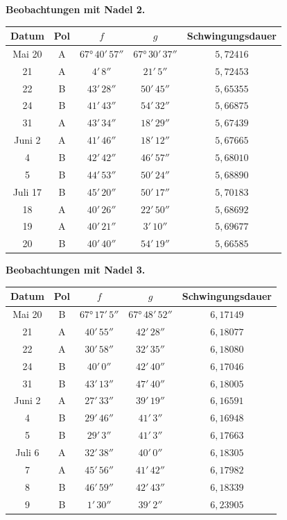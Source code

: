 \documentclass[12pt,a4paper]{article}
\begin{document}
\begin{center}
\small
\textbf{Beobachtungen mit Nadel 2.}
\begin{tabular}{c|c|c|c|c}
\hline
Datum & Pol & $f$ & $g$ & Schwingungsdauer \\
\hline
Mai 20 & A & $67°\,40'\,57''$ & $67°\,30'\,37''$ & $5{,}72416$ \\
21 & A & $4'\,8''$ & $21'\,5''$ & $5{,}72453$ \\
22 & B & $43'\,28''$ & $50'\,45''$ & $5{,}65355$ \\
24 & B & $41'\,43''$ & $54'\,32''$ & $5{,}66875$ \\
31 & A & $43'\,34''$ & $18'\,29''$ & $5{,}67439$ \\
Juni 2 & A & $41'\,46''$ & $18'\,12''$ & $5{,}67665$ \\
4 & B & $42'\,42''$ & $46'\,57''$ & $5{,}68010$ \\
5 & B & $44'\,53''$ & $50'\,24''$ & $5{,}68890$ \\
Juli 17 & B & $45'\,20''$ & $50'\,17''$ & $5{,}70183$ \\
18 & A & $40'\,26''$ & $22'\,50''$ & $5{,}68692$ \\
19 & A & $40'\,21''$ & $3'\,10''$ & $5{,}69677$ \\
20 & B & $40'\,40''$ & $54'\,19''$ & $5{,}66585$ \\
\hline
\end{tabular}
\end{center}

\begin{center}
\small
\textbf{Beobachtungen mit Nadel 3.}
\begin{tabular}{c|c|c|c|c}
\hline
Datum & Pol & $f$ & $g$ & Schwingungsdauer \\
\hline
Mai 20 & B & $67°\,17'\,5''$ & $67°\,48'\,52''$ & $6{,}17149$ \\
21 & A & $40'\,55''$ & $42'\,28''$ & $6{,}18077$ \\
22 & A & $30'\,58''$ & $32'\,35''$ & $6{,}18080$ \\
24 & B & $40'\,0''$ & $42'\,40''$ & $6{,}17046$ \\
31 & B & $43'\,13''$ & $47'\,40''$ & $6{,}18005$ \\
Juni 2 & A & $27'\,33''$ & $39'\,19''$ & $6{,}16591$ \\
4 & B & $29'\,46''$ & $41'\,3''$ & $6{,}16948$ \\
5 & B & $29'\,3''$ & $41'\,3''$ & $6{,}17663$ \\
Juli 6 & A & $32'\,38''$ & $40'\,0''$ & $6{,}18305$ \\
7 & A & $45'\,56''$ & $41'\,42''$ & $6{,}17982$ \\
8 & B & $46'\,59''$ & $42'\,43''$ & $6{,}18339$ \\
9 & B & $1'\,30''$ & $39'\,2''$ & $6{,}23905$ \\
\hline
\end{tabular}
\end{center}
\end{document}
